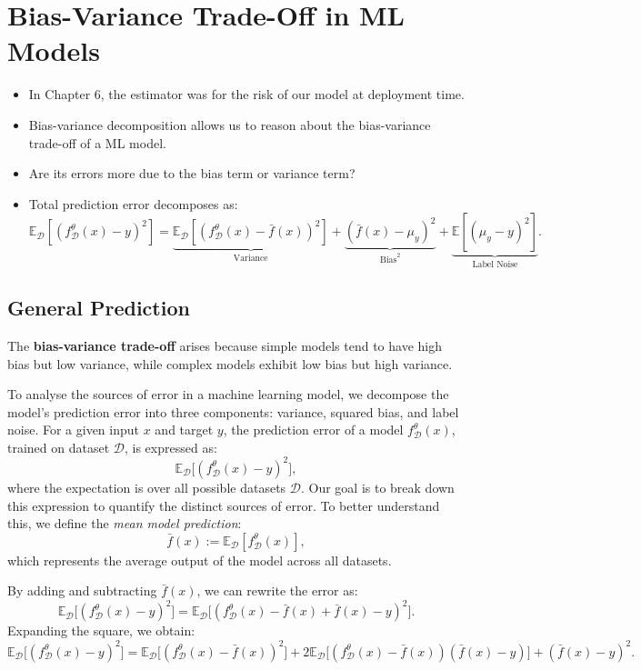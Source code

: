 \section{Bias-Variance Trade-Off in ML Models}

\begin{itemize}
    \item In Chapter 6, the estimator was for the risk of our model at deployment time.
    \item Bias-variance decomposition allows us to reason about the bias-variance trade-off of a ML model.
    \item Are its errors more due to the bias term or variance term?
    \item Total prediction error decomposes as:
          \[
              \mathbb{E}_{\mathcal{D}}[(f_{\mathcal{D}}^\theta(x) - y)^2] = \underbrace{\mathbb{E}_{\mathcal{D}}[(f_{\mathcal{D}}^\theta(x) - \bar{f}(x))^2]}_{\text{Variance}} + \underbrace{(\bar{f}(x) - \mu_y)^2}_{\text{Bias}^2} + \underbrace{\mathbb{E}[(\mu_y - y)^2]}_{\text{Label Noise}}.
          \]
\end{itemize}





\subsection{General Prediction}
The \textbf{bias-variance trade-off} arises because simple models tend to have high bias but low variance, while complex models exhibit low bias but high variance.

To analyse the sources of error in a machine learning model, we decompose the model's prediction error into three components: variance, squared bias, and label noise. For a given input \( x \) and target \( y \), the prediction error of a model \( f_{\mathcal{D}}^\theta(x) \), trained on dataset \( \mathcal{D} \), is expressed as:
\[
    \mathbb{E}_{\mathcal{D}} \big[ (f_{\mathcal{D}}^\theta(x) - y)^2 \big],
\]
where the expectation is over all possible datasets \( \mathcal{D} \). Our goal is to break down this expression to quantify the distinct sources of error. To better understand this, we define the \textit{mean model prediction}:
\[
    \bar{f}(x) := \mathbb{E}_{\mathcal{D}}[f_{\mathcal{D}}^\theta(x)],
\]
which represents the average output of the model across all datasets.

By adding and subtracting \( \bar{f}(x) \), we can rewrite the error as:
\[
    \mathbb{E}_{\mathcal{D}} \big[ (f_{\mathcal{D}}^\theta(x) - y)^2 \big] = \mathbb{E}_{\mathcal{D}} \big[ (f_{\mathcal{D}}^\theta(x) - \bar{f}(x) + \bar{f}(x) - y)^2 \big].
\]
Expanding the square, we obtain:
\[
    \mathbb{E}_{\mathcal{D}} \big[ (f_{\mathcal{D}}^\theta(x) - y)^2 \big] = \mathbb{E}_{\mathcal{D}} \big[ (f_{\mathcal{D}}^\theta(x) - \bar{f}(x))^2 \big] + 2 \mathbb{E}_{\mathcal{D}} \big[ (f_{\mathcal{D}}^\theta(x) - \bar{f}(x)) (\bar{f}(x) - y) \big] + (\bar{f}(x) - y)^2.
\]

